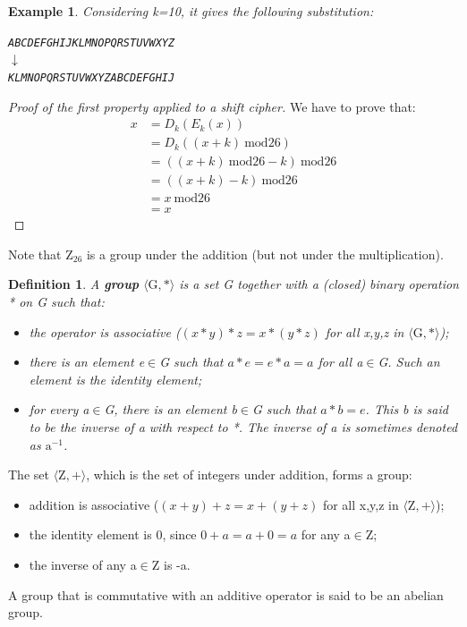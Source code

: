 \documentclass[a4paper, 12pt]{report}
\newtheorem{definition}{\textbf{Definition}}
\newtheorem{example}{\textbf{Example}}
\begin{document}
\begin{example}
	Considering k=10, it gives the following substitution:
	\begin{center}
		\texttt{ABCDEFGHIJKLMNOPQRSTUVWXYZ}\\
		$\downarrow$\\
		\texttt{KLMNOPQRSTUVWXYZABCDEFGHIJ}
	\end{center}
\end{example}

\begin{proof}[Proof of the first property applied to a shift cipher]
	We have to prove that:
	\setcounter{equation}{0}
	\begin{align}
		x &= D_k(E_k(x)) \\
		&=D_k((x+k) \ \textrm{mod}26) \\
		&=((x+k) \ \textrm{mod}26 - k) \ \textrm{mod}26 \\
		&=((x+k) - k) \ \textrm{mod}26 \\
		&=x \ \textrm{mod}26 \\
		&=x
	\end{align}
\end{proof}
Note that $\textrm{Z}_{26}$ is a group under the addition (but not under the multiplication).

\begin{definition}
	A \textbf{group} $\langle\textrm{G},*\rangle$ is a set G together with a (closed) binary operation * on G such that:
	\begin{itemize}
		\item the operator is associative ($(x*y)*z =x*(y*z)$ for all x,y,z in $\langle\textrm{G},*\rangle$);
		\item there is an element e$\in$G such that $a*e = e*a = a$ for all a$\in$G. Such an element is the identity element;
		\item for every a$\in$G, there is an element b$\in$G such that $a*b=e$. This b is said to be the inverse of a with respect to *. The inverse of a is sometimes denoted as $\textrm{a}^{-1}$.
	\end{itemize}
\end{definition}
\vspace{5mm}
The set $\langle\textrm{Z},+\rangle$, which is the set of integers under addition, forms a group:
\begin{itemize}
	\item addition is associative ($(x+y)+z = x+(y+z)$ for all x,y,z in $\langle\textrm{Z},+\rangle$);
	\item the identity element is 0, since $0+a = a+0 = a$ for any a$\in$Z;
	\item the inverse of any a$\in$Z is -a.
\end{itemize}
A group that is commutative with an additive operator is said to be an abelian group.
\end{document}
